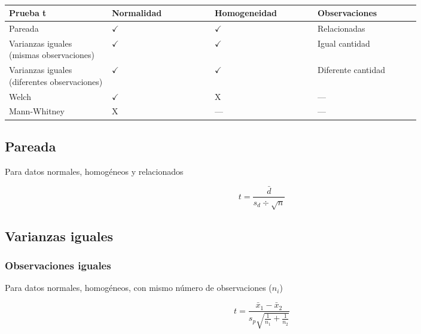 \documentclass{AsignaturaResumen}
\begin{document}
\begin{table}[H]
\centering
\caption{}
\label{tab:}
{\small{}

\begin{tabular}{m{0.2\linewidth}m{0.2\linewidth}m{0.2\linewidth}m{0.2\linewidth}}\hline
    
    \textbf{Prueba t} & \textbf{Normalidad} & \textbf{Homogeneidad} & \textbf{Observaciones} \\ \hline
    
    Pareada                                      & $\checkmark$ & $\checkmark$ &    Relacionadas    \\ 
    Varianzas iguales (mismas observaciones)     & $\checkmark$ & $\checkmark$ &   Igual cantidad   \\ 
    Varianzas iguales (diferentes observaciones) & $\checkmark$ & $\checkmark$ & Diferente cantidad \\ 
    Welch                                        & $\checkmark$ & $\mathrm{X}$ &        ---         \\
    Mann-Whitney                                 & $\mathrm{X}$ &     ---      &        ---         \\ 

    \hline
\end{tabular}}
\end{table}

\subsection{Pareada}

Para datos normales, homogéneos y relacionados

\begin{equation*}
    t = \frac{\bar{d}}{s_{d} \div \sqrt{n}}
\end{equation*}


\subsection{Varianzas iguales}

\subsubsection{Observaciones iguales}

Para datos normales, homogéneos, con mismo número de observaciones ($n_{i}$)

\begin{equation*}
    t = \frac{\bar{x}_{1} - \bar{x}_{2}}{s_{p}\sqrt{\frac{1}{n_{1}} + \frac{1}{n_{2}}}}
\end{equation*}
\end{document}
